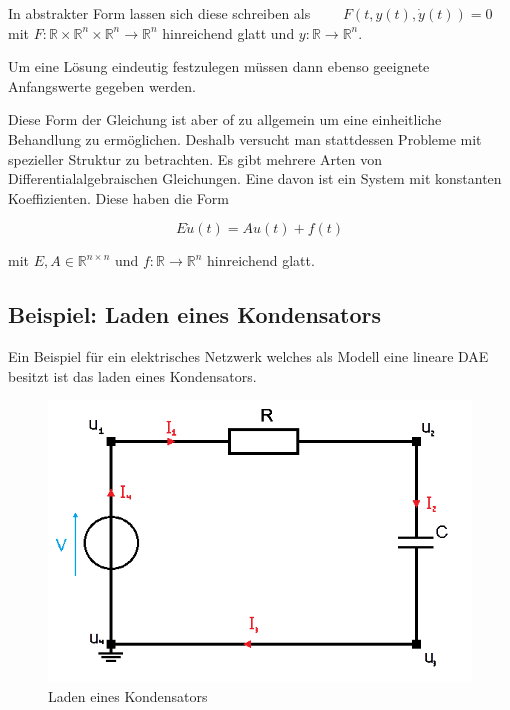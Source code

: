 \documentclass[11pt,titlepage]{article}
\begin{document}
		In abstrakter Form lassen sich diese schreiben als 
		$\qquad F(t, y(t), \dot{y}(t)) = 0$ \newline
		mit $F:\mathbb{R} \times \mathbb{R}^n \times \mathbb{R}^n \to \mathbb{R}^n$ hinreichend glatt und $y:\mathbb{R} \to \mathbb{R}^n$.
		
		Um eine Lösung eindeutig festzulegen müssen dann ebenso geeignete Anfangswerte gegeben werden.
		
		Diese Form der Gleichung ist aber of zu allgemein um eine einheitliche Behandlung zu ermöglichen. Deshalb versucht man stattdessen Probleme mit spezieller Struktur zu betrachten. Es gibt mehrere Arten von Differentialalgebraischen Gleichungen. Eine davon ist ein System mit konstanten Koeffizienten. Diese haben die Form
		
		\begin{displaymath}
			E \dot{u}(t) = A u(t) + f(t)
		\end{displaymath}
		
		mit $E, A \in \mathbb{R}^{n \times n}$ und $f:\mathbb{R} \to \mathbb{R}^n$ hinreichend glatt.
		
		\subsection{Beispiel: Laden eines Kondensators}
		
		Ein Beispiel für ein elektrisches Netzwerk welches als Modell eine lineare DAE besitzt ist das laden eines Kondensators.
		
		\begin{figure}[H]
			\centering
			\includegraphics[scale=0.7]{Photos/Kondensator}
			\caption{Laden eines Kondensators}
		\end{figure}
		
\end{document}
